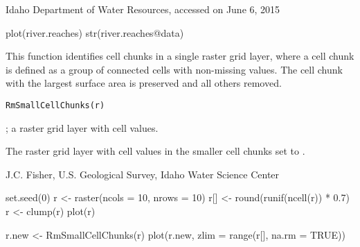 \documentclass[letterpaper]{book}
\begin{document}
%
\begin{Source}\relax
Idaho Department of Water Resources, accessed on June 6, 2015
\end{Source}
%
\begin{Examples}
\begin{ExampleCode}
plot(river.reaches)
str(river.reaches@data)
\end{ExampleCode}
\end{Examples}
%
\begin{Description}\relax
This function identifies cell chunks in a single raster grid layer,
where a cell chunk is defined as a group of connected cells with non-missing values.
The cell chunk with the largest surface area is preserved and all others removed.
\end{Description}
%
\begin{Usage}
\begin{verbatim}
RmSmallCellChunks(r)
\end{verbatim}
\end{Usage}
%
\begin{Arguments}
\begin{ldescription}
\item[\code{r}] ; a raster grid layer with cell values.
\end{ldescription}
\end{Arguments}
%
\begin{Value}
The raster grid layer  with cell values in the smaller cell chunks set to .
\end{Value}
%
\begin{Author}\relax
J.C. Fisher, U.S. Geological Survey, Idaho Water Science Center
\end{Author}
%
\begin{SeeAlso}\relax
{}
\end{SeeAlso}
%
\begin{Examples}
\begin{ExampleCode}
set.seed(0)
r <- raster(ncols = 10, nrows = 10)
r[] <- round(runif(ncell(r)) * 0.7)
r <- clump(r)
plot(r)

r.new <- RmSmallCellChunks(r)
plot(r.new, zlim = range(r[], na.rm = TRUE))
\end{ExampleCode}
\end{Examples}
\end{document}
